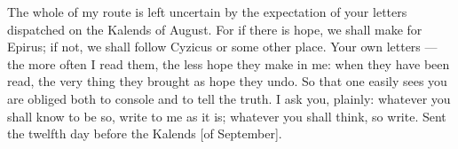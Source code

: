 

 The whole of my route is left uncertain by the expectation of your letters dispatched on the Kalends of August. For if there is hope, we shall make for Epirus; if not, we shall follow Cyzicus or some other place. Your own letters --- the more often I read them, the less hope they make in me: when they have been read, the very thing they brought as hope they undo. So that one easily sees you are obliged both to console and to tell the truth. I ask you, plainly: whatever you shall know to be so, write to me as it is; whatever you shall think, so write. Sent the twelfth day before the Kalends [of September].
